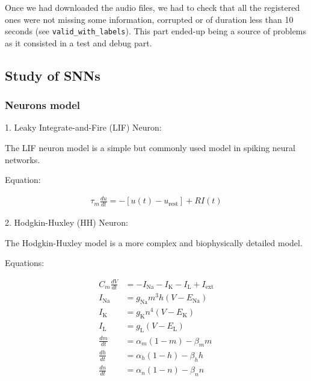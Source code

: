 \documentclass[11pt]{article}
\begin{document}
Once we had downloaded the audio files, we had to check that all the registered ones were not missing some information, corrupted or of duration less than 10 seconds (see \texttt{valid\_with\_labels}). This part ended-up being a source of problems as it consisted in a test and debug part.

\pagebreak


\subsection{Study of SNNs}

\subsubsection{Neurons model}
1. Leaky Integrate-and-Fire (LIF) Neuron:

The LIF neuron model is a simple but commonly used model in spiking neural networks.


Equation:

\begin{align*}
    \tau_m \frac{du}{dt} = -[u(t) - u_{\text{rest}}] + RI(t)
\end{align*}



2. Hodgkin-Huxley (HH) Neuron:

The Hodgkin-Huxley model is a more complex and biophysically detailed model.

Equations:

\begin{align*}
C_m \frac{dV}{dt} &= -I_{\text{Na}} - I_{\text{K}} - I_{\text{L}} + I_{\text{ext}} \\
I_{\text{Na}} &= g_{\text{Na}} m^3 h (V - E_{\text{Na}}) \\
I_{\text{K}} &= g_{\text{K}} n^4 (V - E_{\text{K}}) \\
I_{\text{L}} &= g_{\text{L}} (V - E_{\text{L}}) \\
\frac{dm}{dt} &= \alpha_m (1 - m) - \beta_m m \\
\frac{dh}{dt} &= \alpha_h (1 - h) - \beta_h h \\
\frac{dn}{dt} &= \alpha_n (1 - n) - \beta_n n \\
\end{align*}
\end{document}

